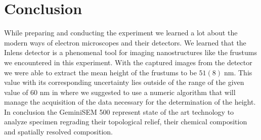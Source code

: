 
\section{Conclusion}
While preparing and conducting the experiment we learned a lot about the modern ways of electron microscopes and their detectors. We learned that the Inlens detector is a phenomenal tool for imaging nanostructures like the frustums we encountered in this experiment. With the captured images from the detector we were able to extract the mean height of the frustums to be $51(8)\;\mathrm{nm}$. This value with its corresponding uncertainty lies outside of the range of the given value of 60 nm in \cite{labdesc} where we suggested to use a numeric algorithm that will manage the acquisition of the data necessary for the determination of the height.\mypar
In conclusion the GeminiSEM 500 represent state of the art technology to analyze specimen regrading their topological relief, their chemical composition and spatially resolved composition.

